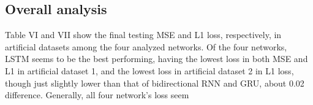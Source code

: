 \documentclass[letterpaper, 10 pt, conference]{ieeeconf}  %
\begin{document}
    \subsection{Overall analysis}
        Table VI and VII show the final testing MSE and L1 loss, respectively, in artificial datasets among the four analyzed networks. Of the four networks, LSTM seems to be the best performing, having the lowest loss in both MSE and L1 in artificial dataset 1, and the lowest loss in artificial dataset 2 in L1 loss, though just slightly lower than that of bidirectional RNN and GRU, about 0.02 difference. Generally, all four network's loss seem
        \begin{table}[h!] \centering
            \caption{Final testing MSE loss in artificial datasets comparison table (highlighted means lowest loss of four networks in corresponding dataset)}
            \begin{threeparttable}
            \end{threeparttable}
        \end{table}
        \begin{table}[h!] \centering
            \caption{Final testing L1 loss in artificial datasets comparison table (highlighted means lowest loss of four networks in corresponding dataset)}
            \begin{threeparttable}
            \end{threeparttable}
        \end{table}
\end{document}
